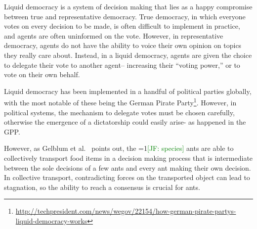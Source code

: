 \documentclass[12pt]{article}
\newcommand{\Comments}{1}
\newcommand{\mynote}[2]{\ifnum\Comments=1\textcolor{#1}{#2}\fi}
\newcommand{\jessie}[1]{\mynote{green}{[JF: #1]}}
\begin{document}
Liquid democracy is a system of decision making that lies as a happy compromise between true and representative democracy.
True democracy, in which everyone votes on every decision to be made, is often difficult to implement in practice, and agents are often uninformed on the vote.
However, in representative democracy, agents do not have the ability to voice their own opinion on topics they really care about.
Instead, in a liquid democracy, agents are given the choice to delegate their vote to another agent-- increasing their ``voting power,'' or to vote on their own behalf.


Liquid democracy has been implemented in a handful of political parties globally, with the most notable of these being the German Pirate Party\footnote{\url{http://techpresident.com/news/wegov/22154/how-german-pirate-partys-liquid-democracy-works}}.
However, in political systems, the mechanism to delegate votes must be chosen carefully, otherwise the emergence of a dictatorship could easily arise- as happened in the GPP.

However, as Gelblum et al.~\cite{gelblum2015ant} points out, the \jessie{species} ants are able to collectively transport food items in a decision making process that is intermediate between the sole decisions of a few ants and every ant making their own decision.
In collective transport, contradicting forces on the transported object can lead to stagnation, so the ability to reach a consensus is crucial for ants.





\end{document}

